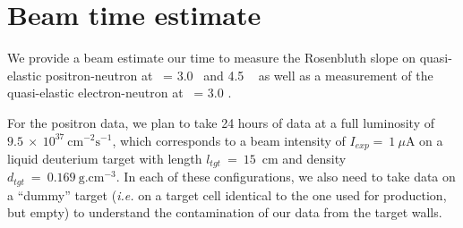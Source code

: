\section{Beam time estimate}

We provide a beam estimate our time to measure the Rosenbluth slope on quasi-elastic positron-neutron at \qsq~= 3.0 \gevcsq~and 4.5 \gevcsq~ as well as a measurement of the quasi-elastic electron-neutron at \qsq~= 3.0 \gevcsq.

For the positron data, we plan to take 24 hours of data at a full luminosity of $9.5~\times~10^{37}~\mathrm{cm}^{-2}\mathrm{s}^{-1}$, which corresponds to a beam intensity of $I_{exp} =~1~\mu$A on a liquid deuterium target with length $l_{tgt}~=~15$~cm and density $d_{tgt}~=~0.169~\mathrm{g.cm}^{-3}$. 
In each of these configurations, we also need to take data on a ``dummy'' target ({\it i.e.} on a target cell identical to the one used for production, but empty) to understand the contamination of our data from the target walls.

